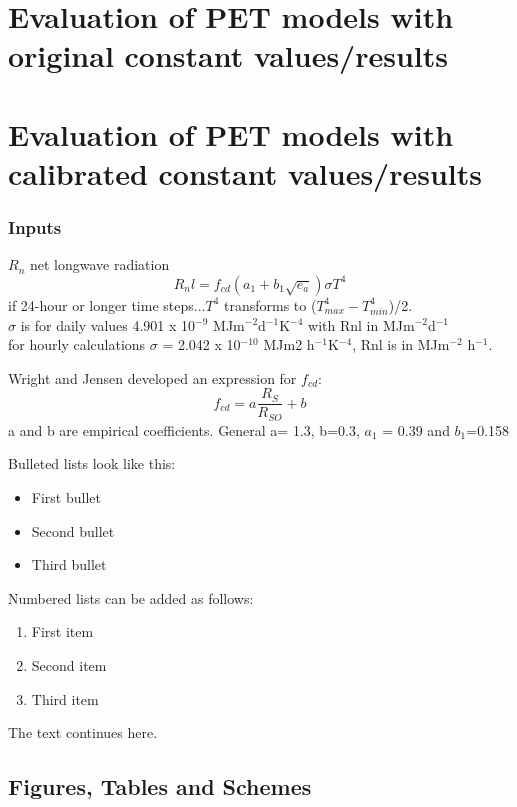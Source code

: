 \documentclass[hydrology,article,submit,moreauthors,pdftex]{Definitions/mdpi}
\begin{document}
\section{Evaluation of PET models with original constant values/results}
\section{Evaluation of PET models with calibrated constant values/results}



\subsubsection{Inputs}

$R_n$ net longwave radiation
\begin{equation}
R_nl = f_{cd} (a_1+b_1\sqrt{e_a})\sigma T^4
\end{equation}
if 24-hour or longer time steps...$T^4$ transforms to ($T^4_{max}-T^4_{min}$)/2. \\
$\sigma$ is for daily values 4.901 x 10$^{-9}$ MJm$^{-2}$d$^{-1}$K$^{-4}$ with Rnl in MJm$^{-2}$d$^{-1}$ \\
for hourly calculations $\sigma$ = 2.042 x 10$^{-10}$ MJm2 h$^{-1}$K$^{-4}$, Rnl is in MJm$^{-2}$ h$^{-1}$.

Wright and Jensen \cite{wright1972peak} developed an expression for $f_{cd}$:
\begin{equation}
f_{cd} = a \frac{R_S}{R_{SO}} + b
\end{equation}
a and b are empirical coefficients. General a= 1.3, b=0.3, $a_1$ = 0.39 and $b_1$=0.158

Bulleted lists look like this:
\begin{itemize}[leftmargin=*,labelsep=5.8mm]
\item	First bullet
\item	Second bullet
\item	Third bullet
\end{itemize}

Numbered lists can be added as follows:
\begin{enumerate}[leftmargin=*,labelsep=4.9mm]
\item	First item 
\item	Second item
\item	Third item
\end{enumerate}

The text continues here.

\subsection{Figures, Tables and Schemes}
\end{document}
